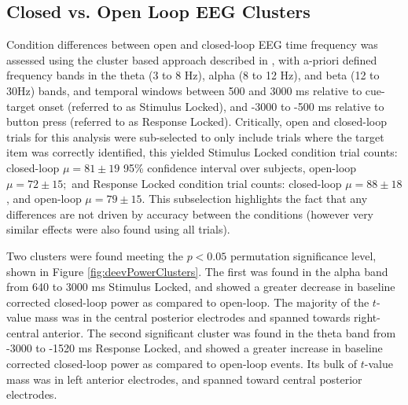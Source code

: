 \documentclass[11pt, titlepage, twoside]{article}
\begin{document}
\subsection{Closed vs. Open Loop EEG Clusters}
\label{sec:deevCLvOL}
Condition differences between open and closed-loop EEG time frequency was assessed using the cluster based approach described in \textcite{MarisOostenveld07}, with a-priori defined frequency bands in the theta (3 to 8 Hz), alpha (8 to 12 Hz), and beta (12 to 30Hz) bands, and temporal windows between 500 and 3000 ms relative to cue-target onset (referred to as Stimulus Locked), and -3000 to -500 ms relative to button press (referred to as Response Locked).  Critically, open and closed-loop trials for this analysis were sub-selected to only include trials where the target item was correctly identified, this yielded Stimulus Locked condition trial counts: closed-loop $\mu=81\pm19$ 95\% confidence interval over subjects, open-loop $\mu=72\pm15;$ and Response Locked condition trial counts: closed-loop $\mu=88\pm18$, and open-loop $\mu=79\pm15$.  This subselection highlights the fact that any differences are not driven by accuracy between the conditions (however very similar effects were also found using all trials). 

Two clusters were found meeting the $p<0.05$ permutation significance level, shown in Figure \ref{fig:deevPowerClusters}.  The first was found in the alpha band from 640 to 3000 ms Stimulus Locked, and showed a greater decrease in baseline corrected closed-loop power as compared to open-loop.  The majority of the $t$-value mass was in the central posterior electrodes and spanned towards right-central anterior.  The second significant cluster was found in the theta band from -3000 to -1520 ms Response Locked, and showed a greater increase in baseline corrected closed-loop power as compared to open-loop events.  Its bulk of $t$-value mass was in left anterior electrodes, and spanned toward central posterior electrodes. 
\end{document}
